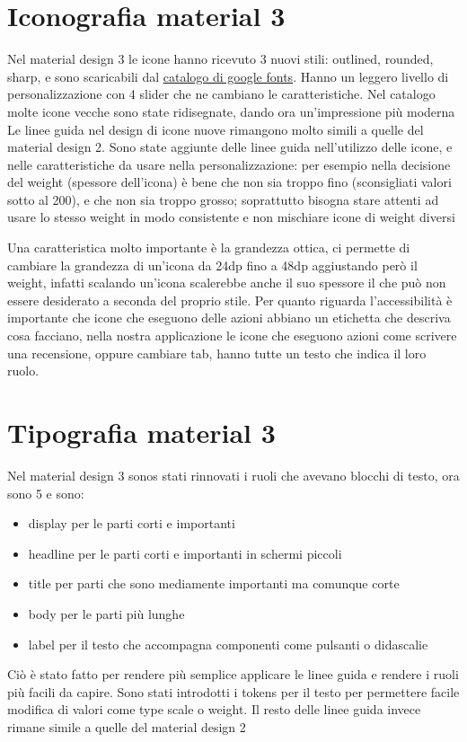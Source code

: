 \documentclass[12pt, a4paper]{report}
\begin{document}
	\section{Iconografia material 3}
		Nel material design 3 le icone hanno ricevuto 3 nuovi stili: outlined, rounded, sharp, e sono scaricabili dal \href{https://fonts.google.com/icons}{catalogo di google fonts}. Hanno un leggero livello di personalizzazione con 4 slider che ne cambiano le caratteristiche.
		Nel catalogo molte icone vecche sono state ridisegnate, dando ora un'impressione più moderna
		Le linee guida nel design di icone nuove rimangono molto simili a quelle del material design 2.
		Sono state aggiunte delle linee guida nell'utilizzo delle icone, e nelle caratteristiche da usare nella personalizzazione: per esempio nella decisione del weight (spessore dell'icona) è bene che non sia troppo fino (sconsigliati valori sotto al 200), e che non sia troppo grosso; soprattutto bisogna stare attenti ad usare lo stesso weight in modo consistente e non mischiare icone di weight diversi

		Una caratteristica molto importante è la grandezza ottica, ci permette di cambiare la grandezza di un'icona da 24dp fino a 48dp aggiustando però il weight, infatti scalando un'icona scalerebbe anche il suo spessore il che può non essere desiderato a seconda del proprio stile.
		Per quanto riguarda l'accessibilità è importante che icone che eseguono delle azioni abbiano un etichetta che descriva cosa facciano, nella nostra applicazione le icone che eseguono azioni come scrivere una recensione, oppure cambiare tab, hanno tutte un testo che indica il loro ruolo.
	\section{Tipografia material 3}
		Nel material design 3 sonos stati rinnovati i ruoli che avevano blocchi di testo, ora sono 5 e sono:
		\begin{itemize}
			\item display per le parti corti e importanti
			\item headline per le parti corti e importanti in schermi piccoli
			\item title	per parti che sono mediamente importanti ma comunque corte
			\item body per le parti più lunghe
			\item label per il testo che accompagna componenti come pulsanti o didascalie
		\end{itemize}
		Ciò è stato fatto per rendere più semplice applicare le linee guida e rendere i ruoli più facili da capire.
		Sono stati introdotti i tokens per il testo per permettere facile modifica di valori come type scale o weight.
		Il resto delle linee guida invece rimane simile a quelle del material design 2
	


\printbibliography
\end{document}
